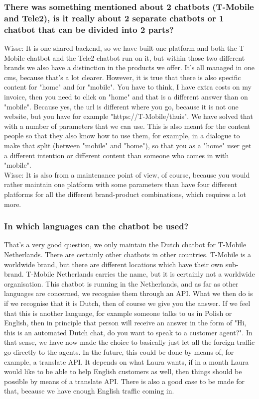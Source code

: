\begin{appendices}
	\subsubsection{There was something mentioned about 2 chatbots (T-Mobile and Tele2), is it really about 2 separate chatbots or 1 chatbot that can be divided into 2 parts?}
	Wisse: It is one shared backend, so we have built one platform and both the T-Mobile chatbot and the Tele2 chatbot run on it, but within those two different brands we also have a distinction in the products we offer. It's all managed in one \acrfull{cms}, because that's a lot clearer. However, it is true that there is also specific content for "home" and for "mobile". You have to think, I have extra costs on my invoice, then you need to click on "home" and that is a different answer than on "mobile". Because yes, the \acrshort{url} is different where you go, because it is not one website, but you have for example "https://T-Mobile/thuis". We have solved that with a number of parameters that we can use. This is also meant for the content people so that they also know how to use them, for example, in a dialogue to make that split (between "mobile" and "home"), so that you as a "home" user get a different intention or different content than someone who comes in with "mobile".\\
	\break
	Wisse: It is also from a maintenance point of view, of course, because you would rather maintain one platform with some parameters than have four different platforms for all the different brand-product combinations, which requires a lot more.
	
	\subsubsection{In which languages can the chatbot be used?}
	That's a very good question, we only maintain the Dutch chatbot for T-Mobile Netherlands. There are certainly other chatbots in other countries. T-Mobile is a worldwide brand, but there are different locations which have their own sub-brand. T-Mobile Netherlands carries the name, but it is certainly not a worldwide organisation. This chatbot is running in the Netherlands, and as far as other languages are concerned, we recognise them through an API. What we then do is if we recognise that it is Dutch, then of course we give you the answer. If we feel that this is another language, for example someone talks to us in Polish or English, then in principle that person will receive an answer in the form of "Hi, this is an automated Dutch chat, do you want to speak to a customer agent?". In that sense, we have now made the choice to basically just let all the foreign traffic go directly to the agents. In the future, this could be done by means of, for example, a translate API. It depends on what Laura wants, if in a month Laura would like to be able to help English customers as well, then things should be possible by means of a translate API. There is also a good case to be made for that, because we have enough English traffic coming in.
	

\end{appendices}
